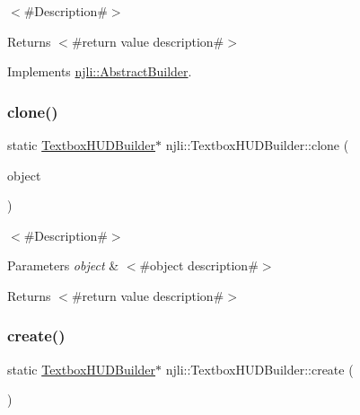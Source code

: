 $<$\#\+Description\#$>$

\begin{DoxyReturn}{Returns}
$<$\#return value description\#$>$ 
\end{DoxyReturn}


Implements \mbox{\hyperlink{classnjli_1_1_abstract_builder_aa1d220053e182c37b31b427499c6eacf}{njli\+::\+Abstract\+Builder}}.

\mbox{\label{classnjli_1_1_textbox_h_u_d_builder_a3470cc221f74b8d1e03d52a948ebae83}} 
\subsubsection{\texorpdfstring{clone()}{clone()}}
{\footnotesize\ttfamily static \mbox{\hyperlink{classnjli_1_1_textbox_h_u_d_builder}{Textbox\+H\+U\+D\+Builder}}$\ast$ njli\+::\+Textbox\+H\+U\+D\+Builder\+::clone (\begin{DoxyParamCaption}\item[{const \mbox{\hyperlink{classnjli_1_1_textbox_h_u_d_builder}{Textbox\+H\+U\+D\+Builder}} \&}]{object }\end{DoxyParamCaption})\hspace{0.3cm}{\ttfamily [static]}}

$<$\#\+Description\#$>$


\begin{DoxyParams}{Parameters}
{\em object} & $<$\#object description\#$>$\\
\hline
\end{DoxyParams}
\begin{DoxyReturn}{Returns}
$<$\#return value description\#$>$ 
\end{DoxyReturn}
\mbox{\label{classnjli_1_1_textbox_h_u_d_builder_a31b502c61f888b033d195d5a9f9e0ad9}} 
\subsubsection{\texorpdfstring{create()}{create()}}
{\footnotesize\ttfamily static \mbox{\hyperlink{classnjli_1_1_textbox_h_u_d_builder}{Textbox\+H\+U\+D\+Builder}}$\ast$ njli\+::\+Textbox\+H\+U\+D\+Builder\+::create (\begin{DoxyParamCaption}{ }\end{DoxyParamCaption})\hspace{0.3cm}{\ttfamily [static]}}

